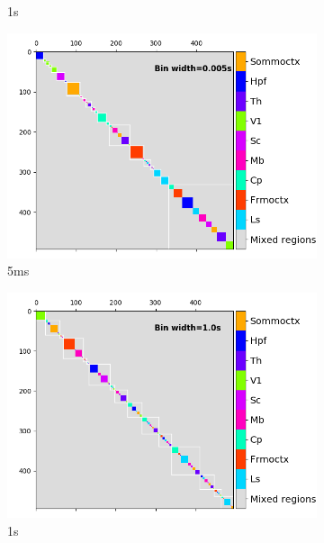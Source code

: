 \begin{figure}[p]
\begin{subfigure}[h]{0.5\linewidth}
      \caption{1s}
      \label{fig:absolute_consensus_cluster_1s}
    \end{subfigure}
    \begin{subfigure}[h]{0.5\linewidth}
      \includegraphics[width=\linewidth]{figures/eight_probe/Krebs_0p005_regional_cluster_map_total_absolute.png}
      \caption{5ms}
      \label{fig:absolute_regional_cluster_map_5ms}
    \end{subfigure}
    \begin{subfigure}[h]{0.5\linewidth}
      \includegraphics[width=\linewidth]{figures/eight_probe/Krebs_1p0_regional_cluster_map_total_absolute.png}
      \caption{1s}
      \label{fig:absolute_regional_cluster_map_1s}
    \end{subfigure}
    \begin{subfigure}[h]{0.5\linewidth}

\end{subfigure}
\end{figure}

